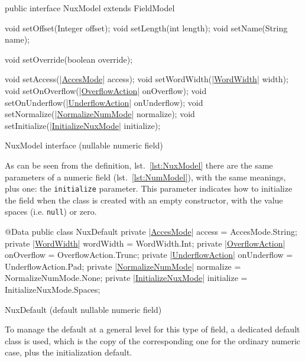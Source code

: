 \documentclass[a4paper,10pt]{report}
\newenvironment{elisting}[1][H]
  {\captionsetup{aboveskip=0pt}\begin{listing}[#1]}
  {\end{listing}%
}
\begin{document}
\begin{elisting}[!htb]
\begin{javacode}
public interface NuxModel extends FieldModel {
    void setOffset(Integer offset);
    void setLength(int length);
    void setName(String name);

    void setOverride(boolean override);

    void setAccess(|\hyperref[lst:AccesMode]{AccesMode}| access);
    void setWordWidth(|\hyperref[lst:WordWidth]{WordWidth}| width);
    void setOnOverflow(|\hyperref[lst:OverflowAction]{OverflowAction}| onOverflow);
    void setOnUnderflow(|\hyperref[lst:UnderflowAction]{UnderflowAction}| onUnderflow);
    void setNormalize(|\hyperref[lst:NormalizeNumMode]{NormalizeNumMode}| normalize);
    void setInitialize(|\hyperref[lst:InitializeNuxMode]{InitializeNuxMode}| initialize);
}
\end{javacode}
\caption{NuxModel interface (nullable numeric field)}
\label{lst:NuxModel}
\end{elisting}

As can be seen from the definition, lst.~\ref{lst:NuxModel} there are the same 
parameters of a numeric field (lst.~\ref{lst:NumModel}), with the same meanings, 
plus one: the \verb!initialize! parameter. 
This parameter indicates how to initialize the field when the class is created 
with an empty constructor, with the value spaces (i.e. \verb!null!) or zero.

\begin{elisting}[!htb]
\begin{javacode}
@Data
public class NuxDefault {
    private |\hyperref[lst:AccesMode]{AccesMode}| access = AccesMode.String;
    private |\hyperref[lst:WordWidth]{WordWidth}| wordWidth = WordWidth.Int;
    private |\hyperref[lst:OverflowAction]{OverflowAction}| onOverflow = OverflowAction.Trunc;
    private |\hyperref[lst:UnderflowAction]{UnderflowAction}| onUnderflow = UnderflowAction.Pad;
    private |\hyperref[lst:NormalizeNumMode]{NormalizeNumMode}| normalize = NormalizeNumMode.None;
    private |\hyperref[lst:InitializeNuxMode]{InitializeNuxMode}| initialize = InitializeNuxMode.Spaces;
}
\end{javacode}
\caption{NuxDefault (default nullable numeric field)}
\label{lst:NuxDefault}
\end{elisting}

To manage the default at a general level for this type of field, a dedicated 
default class is used, which is the copy of the corresponding one for the 
ordinary numeric case, plus the initialization default.
\end{document}
